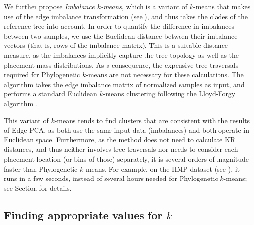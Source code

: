 We further propose \emph{Imbalance $k$-means},
which is a variant of $k$-means that makes use of the edge imbalance transformation
(see ),
and thus takes the clades of the reference tree into account.
In order to quantify the difference in imbalances between two samples,
we use the Euclidean distance between their imbalance vectors (that is, rows of the imbalance matrix).
This is a suitable distance measure,
as the imbalances implicitly capture the tree topology as well as the placement mass distributions.
As a consequence, the expensive tree traversals required for Phylogenetic $k$-means are not necessary for these calculations.
The algorithm takes the edge imbalance matrix of normalized samples as input,
and performs a standard Euclidean $k$-means clustering following the Lloyd-Forgy algorithm \cite{Lloyd1982,Forgy1965}.

This variant of $k$-means tends to find clusters that are consistent with the results of Edge PCA,
as both use the same input data (imbalances) and both operate in Euclidean space. %
Furthermore, as the method does not need to calculate KR distances,
and thus neither involves tree traversals nor needs to consider each placement location (or bins of those) separately,
it is several orders of magnitude faster than Phylogenetic $k$-means.
For example, on the \ac{HMP} dataset (see ),
it runs in a few seconds, instead of several hours needed for Phylogenetic $k$-means;
see Section  for details.


\subsection{Finding appropriate values for \texorpdfstring{$k$}{k}}
\label{ch:Clustering:sec:Methods:sub:FindingK}

